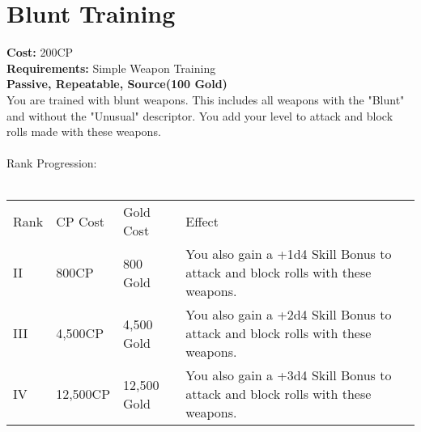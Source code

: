 \section{Blunt Training}\label{perk:bluntTraining}
\textbf{Cost:} 200CP\\
\textbf{Requirements:} Simple Weapon Training\\
\textbf{Passive, Repeatable, Source(100 Gold)}\\
You are trained with blunt weapons.
This includes all weapons with the "Blunt" and without the "Unusual" descriptor.
You add your level to attack and block rolls made with these weapons.\\
\\
Rank Progression:\\
\\
\begin{tabular}{l | l | l | l}
	Rank & CP Cost & Gold Cost & Effect\\
	II & 800CP & 800 Gold & You also gain a +1d4 Skill Bonus to attack and block rolls with these weapons.\\
	III & 4,500CP & 4,500 Gold & You also gain a +2d4 Skill Bonus to attack and block rolls with these weapons.\\
	IV & 12,500CP & 12,500 Gold & You also gain a +3d4 Skill Bonus to attack and block rolls with these weapons.\\
\end{tabular}